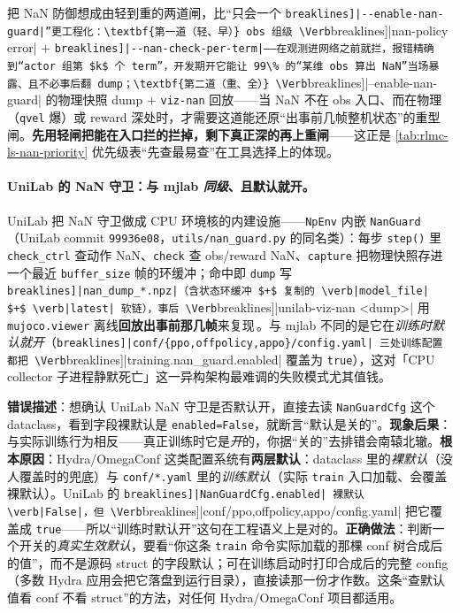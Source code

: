 \begin{insight}\label{ins:rlmc-ls-nan-layered}
把 NaN 防御想成由轻到重的两道闸，比“只会一个 \Verb[breaklines]|--enable-nan-guard|”更工程化：\textbf{第一道（轻、早）} obs 组级 \Verb[breaklines]|nan-policy error| $+$ \Verb[breaklines]|--nan-check-per-term|——在观测进网络之前就拦，报错精确到“actor 组第 $k$ 个 term”，开发期开它能让 99\% 的“某维 obs 算出 NaN”当场暴露、且不必事后翻 dump；\textbf{第二道（重、全）} \Verb[breaklines]|--enable-nan-guard| 的物理快照 dump $+$ \verb|viz-nan| 回放——当 NaN 不在 obs 入口、而在物理（\verb|qvel| 爆）或 reward 深处时，才需要这道能还原“出事前几帧整机状态”的重型闸。\textbf{先用轻闸把能在入口拦的拦掉，剩下真正深的再上重闸}——这正是 \cref{tab:rlmc-ls-nan-priority} 优先级表“先查最易查”在工具选择上的体现。
\end{insight}

\paragraph{UniLab 的 NaN 守卫：与 mjlab \emph{同级}、且默认就开。}UniLab 把 NaN 守卫做成 CPU 环境核的内建设施——\verb|NpEnv| 内嵌 \verb|NanGuard|（UniLab commit \texttt{99936e08}，\texttt{utils/\allowbreak nan\_guard.\allowbreak py} 的同名类）：每步 \verb|step()| 里 \verb|check_ctrl| 查动作 NaN、\verb|check| 查 obs/reward NaN、\verb|capture| 把物理快照存进一个最近 \verb|buffer_size| 帧的环缓冲；命中即 \verb|dump| 写 \Verb[breaklines]|nan_dump_*.npz|（含状态环缓冲 $+$ 复制的 \verb|model_file| $+$ \verb|latest| 软链），事后 \Verb[breaklines]|unilab-viz-nan <dump>| 用 \verb|mujoco.viewer| 离线\textbf{回放出事前那几帧}来复现\,\cite{unilab2026}。与 mjlab 不同的是它在\emph{训练时默认就开}（\Verb[breaklines]|conf/{ppo,offpolicy,appo}/config.yaml| 三处训练配置都把 \Verb[breaklines]|training.nan_guard.enabled| 覆盖为 \verb|true|），这对「CPU collector 子进程静默死亡」这一异构架构最难调的失败模式尤其值钱。

\begin{pitfall}
\textbf{错误描述}：想确认 UniLab NaN 守卫是否默认开，直接去读 \verb|NanGuardCfg| 这个 dataclass，看到字段裸默认是 \verb|enabled=False|，就断言“默认是关的”。\textbf{现象后果}：与实际训练行为相反——真正训练时它是\emph{开}的，你据“关的”去排错会南辕北辙。\textbf{根本原因}：Hydra/OmegaConf 这类配置系统有\textbf{两层默认}：dataclass 里的\emph{裸默认}（没人覆盖时的兜底）与 \verb|conf/*.yaml| 里的\emph{训练默认}（实际 \verb|train| 入口加载、会覆盖裸默认）。UniLab 的 \Verb[breaklines]|NanGuardCfg.enabled| 裸默认 \verb|False|，但 \Verb[breaklines]|conf/{ppo,offpolicy,appo}/config.yaml| 把它覆盖成 \verb|true|——所以“训练时默认开”这句在工程语义上是对的。\textbf{正确做法}：判断一个开关的\emph{真实生效默认}，要看“你这条 \verb|train| 命令实际加载的那棵 conf 树合成后的值”，而不是源码 struct 的字段默认；可在训练启动时打印合成后的完整 config（多数 Hydra 应用会把它落盘到运行目录），直接读那一份才作数。这条“查默认值看 conf 不看 struct”的方法，对任何 Hydra/OmegaConf 项目都适用。
\end{pitfall}

